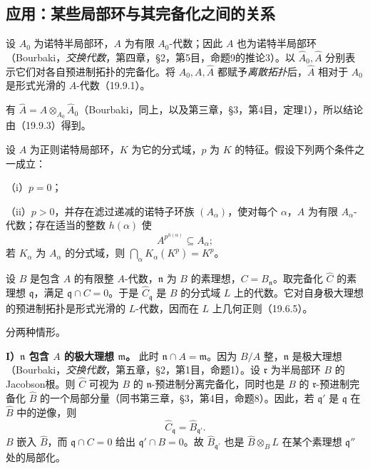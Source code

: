 \subsection{应用：某些局部环与其完备化之间的关系}
设 $A_0$ 为诺特半局部环，$A$ 为有限 $A_0$-代数；因此 $A$ 也为诺特半局部环（Bourbaki，\textit{交换代数}，第四章，§2，第5目，命题9的推论3）。以 $\widehat A_0,\widehat A$ 分别表示它们对各自预进制拓扑的完备化。将 $A_0,A,\widehat A$ 都赋予\emph{离散拓扑}后，$\widehat A$ 相对于 $A_0$ 是形式光滑的 $A$-代数（19.9.1）。

\eproof
有 $\widehat A=A\otimes_{A_0}\widehat A_0$（Bourbaki，同上，以及第三章，§3，第4目，定理1），所以结论由（19.9.3）得到。
\finishproof

设 $A$ 为正则诺特局部环，$K$ 为它的分式域，$p$ 为 $K$ 的特征。假设下列两个条件之一成立：

\noindent（i）$p=0$；

\noindent（ii）$p>0$，并存在滤过递减的诺特子环族 $(A_\alpha)$，使对每个 $\alpha$，$A$ 为有限 $A_\alpha$-代数；存在适当的整数 $h(\alpha)$ 使
\[
 A^{p^{h(\alpha)}}\subseteq A_\alpha;
\]
若 $K_\alpha$ 为 $A_\alpha$ 的分式域，则 $\bigcap_\alpha K_\alpha(K^p)=K^p$。

设 $B$ 是包含 $A$ 的有限整 $A$-代数，$\mathfrak n$ 为 $B$ 的素理想，$C=B_{\mathfrak n}$。取完备化 $\widehat C$ 的素理想 $\mathfrak q$，满足 $\mathfrak q\cap C=0$。于是 $\widehat C_{\mathfrak q}$ 是 $B$ 的分式域 $L$ 上的代数。它对自身极大理想的预进制拓扑是形式光滑的 $L$-代数，因而在 $L$ 上几何正则（19.6.5）。

\eproof
分两种情形。

\noindent\textbf{I）$\mathfrak n$ 包含 $A$ 的极大理想 $\mathfrak m$。}
此时 $\mathfrak n\cap A=\mathfrak m$。因为 $B/A$ 整，$\mathfrak n$ 是极大理想（Bourbaki，\textit{交换代数}，第五章，§2，第1目，命题1）。设 $\mathfrak r$ 为半局部环 $B$ 的Jacobson根。则 $\widehat C$ 可视为 $B$ 的 $\mathfrak n$-预进制分离完备化，同时也是 $B$ 的 $\mathfrak r$-预进制完备化 $\widehat B$ 的一个局部分量（同书第三章，§3，第4目，命题8）。因此，若 $\mathfrak q'$ 是 $\mathfrak q$ 在 $\widehat B$ 中的逆像，则
\[
 \widehat C_{\mathfrak q}=\widehat B_{\mathfrak q'}.
\]
$B$ 嵌入 $\widehat B$，而 $\mathfrak q\cap C=0$ 给出 $\mathfrak q'\cap B=0$。故 $\widehat B_{\mathfrak q'}$ 也是 $\widehat B\otimes_B L$ 在某个素理想 $\mathfrak q''$ 处的局部化。

